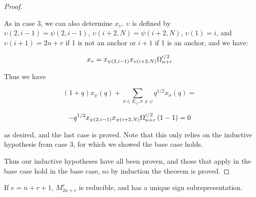 \documentclass{amsart}
\begin{document}
\begin{proof}
\begin{enumerate}[label={\textit{Case \arabic*.}}]
 		As in case 3, we can also determine $x_\upsilon$. $\upsilon$ is defined by $\upsilon(2,i-1)=\psi(2,i-1)$, $\upsilon(i+2,N)=\psi(i+2,N)$, $\upsilon(1)=i$, and $\upsilon(i+1)=2n+r$ if 1 is not an anchor or $i+1$ if 1 is an anchor, and we have:
 		
 		$$x_\upsilon=x_{\psi(2,i-1)}x_{\upsilon(i+2,N)}\Omega_{n+r}^{i/2}$$
 		
 		Thus we have
 		
 		$$(1+q)x_\psi(q)+\sum_{\sigma\in E_\psi,\sigma\not=\psi}q^{1/2}x_\sigma(q)=$$
 		
 		$$-q^{1/2}x_{\psi(2,i-1)}x_{\psi(i+2,N)}\Omega_{n+r}^{i/2}\left( 1-1 \right)=0$$
 		
 		as desired, and the last case is proved. Note that this only relies on the inductive hypothesis from case 3, for which we showed the base case holds.
 	\end{enumerate}
 	
 	Thus our inductive hypotheses have all been proven, and those that apply in the base case hold in the base case, so by induction the theorem is proved.
 	
 \end{proof}
 
 \begin{corollary}
 	If $e=n+r+1$, $M_{2n+r}^r$ is reducible, and has a unique sign subrepresentation.
 \end{corollary}
 
\end{document}
